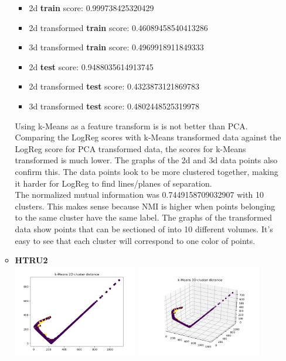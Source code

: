 \documentclass[12pt]{article}
\newcommand{\nextproblem}{
	\vfill
	\pagebreak
}
\begin{document}
\begin{enumerate}[leftmargin=\parindent,align=left,labelwidth=\parindent,noitemsep]
\begin{itemize}[noitemsep,topsep=1pt]
\begin{itemize}
        \item 2d \textbf{train} score: 0.999738425320429
        \item 2d transformed \textbf{train} score: 0.46089458540413286
        \item 3d transformed \textbf{train} score: 0.4969918911849333 \\
        
        \item 2d \textbf{test} score: 0.9488035614913745
        \item 2d transformed \textbf{test} score: 0.4323873121869783
        \item 3d transformed \textbf{test} score: 0.4802448525319978 \\
    \end{itemize}
    Using k-Means as a feature transform is is not better than PCA. Comparing the LogReg scores with k-Means transformed data against the LogReg score for PCA transformed data, the scores for k-Means transformed is much lower. The graphs of the 2d and 3d data points also confirm this. The data points look to be more clustered together, making it harder for LogReg to find lines/planes of separation. \\
    The normalized mutual information was 0.7449158709032907 with 10 clusters. This makes sense because NMI is higher when points belonging to the same cluster have the same label. The graphs of the transformed data show points that can be sectioned of into 10 different volumes. It's easy to see that each cluster will correspond to one color of points.
    \nextproblem
    \item \textbf{HTRU2} \\
    \includegraphics[width=0.45\textwidth]{kmeans_HTRU2_2d} \includegraphics[width=0.45\textwidth]{kmeans_HTRU2_3d} \\

\end{itemize}
\end{enumerate}
\end{document}
